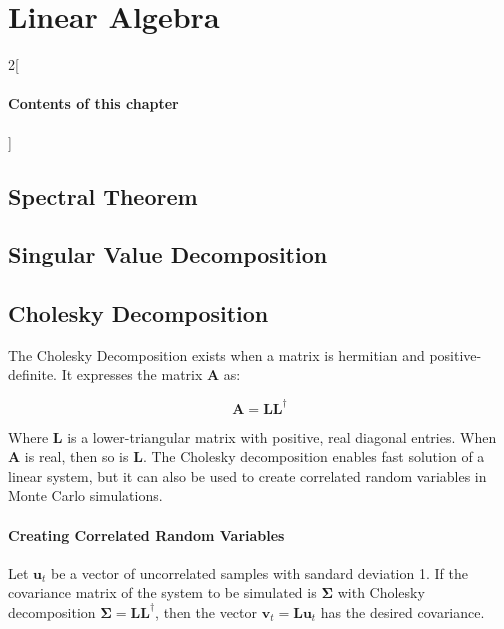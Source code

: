 \chapter{Linear Algebra}

\begin{multicols}{2}[\subsubsection*{Contents of this chapter}]
\end{multicols}

\section{Spectral Theorem}

\section{Singular Value Decomposition}




\section{Cholesky Decomposition}
\label{sec:cholesky}

The Cholesky Decomposition exists when a matrix is hermitian and positive-definite. It expresses the matrix $\mathbf{A}$ as:

\begin{equation}
\mathbf{A} = \mathbf{L}\mathbf{L^\dagger}
\end{equation}

Where $\mathbf{L}$ is a lower-triangular matrix with positive, real diagonal entries. When $\mathbf{A}$ is real, then so is $\mathbf{L}$. The Cholesky decomposition enables fast solution of a linear system, but it can also be used to create correlated random variables in Monte Carlo simulations. 

\subsubsection{Creating Correlated Random Variables}
Let $\mathbf{u}_t$ be a vector of uncorrelated samples with sandard deviation 1. If the covariance matrix of the system to be simulated is  $\mathbf{\Sigma}$ with Cholesky decomposition $\mathbf{\Sigma} = \mathbf{LL}^\dagger$, then the vector $\mathbf{v}_t = \mathbf{Lu}_t$ has the desired covariance.

